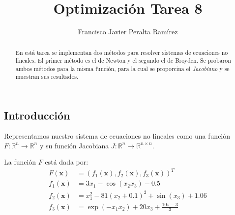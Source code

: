 \documentclass{article}
\title {Optimización Tarea 8}
\author {Francisco Javier Peralta Ramírez}
\begin{document}
\maketitle
\begin{abstract}
  En está tarea se implementan dos métodos para resolver sistemas de ecuaciones no lineales. El primer método es el de Newton y el segundo el de Broyden. Se probaron ambos métodos para la misma función, para la cual se proporcina el \emph{Jacobiano} y se muestran sus resultados.
\end{abstract}
\begin{multicols}{2}

\section{Introducción}

Representamos nuestro sistema de ecuaciones no lineales como una función $F : \mathbb{R}^n \rightarrow \mathbb{R}^n$ y su función Jacobiana $J : \mathbb{R}^n \rightarrow \mathbb{R}^{n\times n}$.

La función $F$ está dada por:
\begin{align*} 
F(\boldsymbol{x}) &= (f_1(\boldsymbol{x}), f_2(\boldsymbol{x}), f_3(\boldsymbol{x}))^T\\
f_1(\boldsymbol{x}) &= 3 x_1 - \cos(x_2x_3) - 0.5\\
f_2(\boldsymbol{x}) &= x^2_1 - 81(x_2 + 0.1)^2 + \sin(x_3) + 1.06\\
f_3(\boldsymbol{x}) &= \exp(-x_1x_2) + 20x_3 +\frac{10\pi - 3}{3} \\
\end{align*}


\end{multicols}
\end{document}
